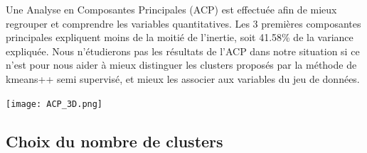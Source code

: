 \documentclass[12pt,a4paper]{book}
\newcommand{\1}{\mathds{1}}
\begin{document}
\vspace{5 mm}
\noindent
Une Analyse en Composantes Principales (ACP) est effectuée afin de mieux regrouper et comprendre les variables quantitatives. Les 3 premières composantes principales expliquent moins de la moitié de l'inertie, soit 41.58\% de la variance expliquée.  Nous n'étudierons pas les résultats de l'ACP dans notre situation si ce n'est pour nous aider à mieux distinguer les clusters proposés par la méthode de kmeans++ semi supervisé, et mieux les associer aux variables du jeu de données.

\begin{center}
\texttt{[image: ACP\_3D.png]}
\end{center}


\vspace{30 mm}
\noindent
\begin{large}
\subsection{Choix du nombre de clusters}
\end{large}
\vspace{5 mm}
\end{document}
